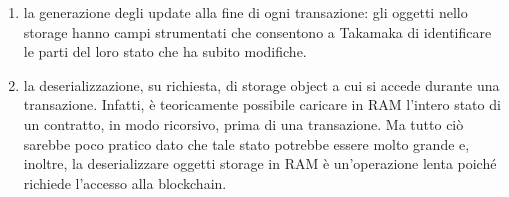 \begin{enumerate}
	\item la generazione degli update alla fine di ogni transazione: gli oggetti nello storage hanno campi strumentati che consentono a Takamaka di identificare le parti del loro stato che ha subito modifiche.
	\item la deserializzazione, su richiesta, di storage object a cui si accede durante una transazione. Infatti, è teoricamente possibile caricare in RAM l'intero stato di un contratto, in modo ricorsivo, prima di una transazione. Ma tutto ciò sarebbe poco pratico dato che tale stato potrebbe essere molto grande e, inoltre, la deserializzare oggetti storage in RAM è un'operazione lenta poiché richiede l'accesso alla blockchain.
\end{enumerate}